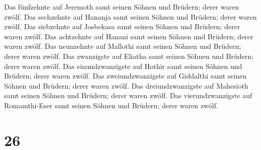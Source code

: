  Das fünfzehnte auf Jeremoth samt seinen Söhnen und
Brüdern; derer waren zwölf.  Das sechzehnte auf Hananja
samt seinen Söhnen und Brüdern; derer waren zwölf.  Das
siebzehnte auf Josbekasa samt seinen Söhnen und Brüdern; derer waren
zwölf.  Das achtzehnte auf Hanani samt seinen Söhnen und
Brüdern; derer waren zwölf.  Das neunzehnte auf Mallothi
samt seinen Söhnen und Brüdern; derer waren zwölf.  Das
zwanzigste auf Eliatha samt seinen Söhnen und Brüdern; derer waren
zwölf.  Das einundzwanzigste auf Hothir samt seinen
Söhnen und Brüdern; derer waren zwölf.  Das
zweiundzwanzigste auf Giddalthi samt seinen Söhnen und Brüdern; derer
waren zwölf.  Das dreiundzwanzigste auf Mahesioth samt
seinen Söhnen und Brüdern; derer waren zwölf.  Das
vierundzwanzigste auf Romamthi-Eser samt seinen Söhnen und Brüdern;
derer waren zwölf.

\hypertarget{section-25}{%
\section{26}\label{section-25}}

